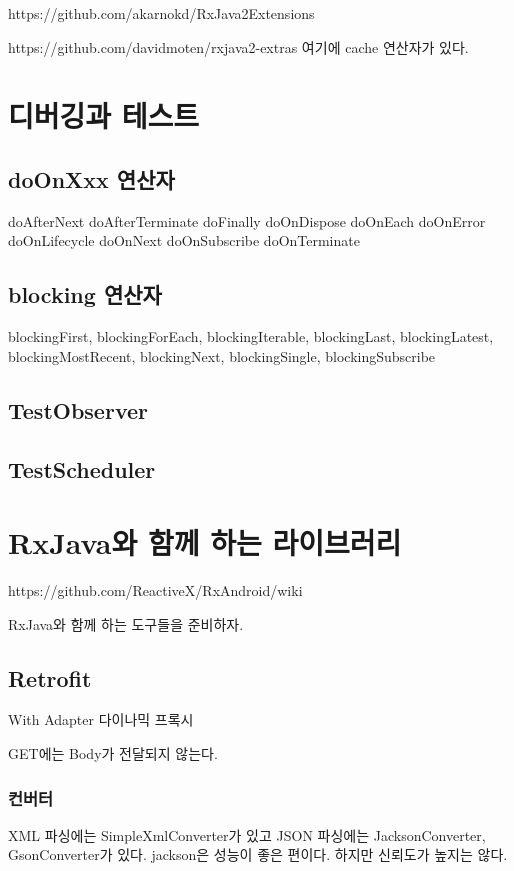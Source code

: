 \documentclass{book}
\begin{document}
{https://github.com/akarnokd/RxJava2Extensions

https://github.com/davidmoten/rxjava2-extras
여기에 cache 연산자가 있다.



\chapter{디버깅과 테스트}	
\section{doOnXxx 연산자}
doAfterNext
doAfterTerminate
doFinally
doOnDispose
doOnEach
doOnError
doOnLifecycle
doOnNext
doOnSubscribe
doOnTerminate

\section{blocking 연산자}
blockingFirst,
blockingForEach,
blockingIterable,
blockingLast,
blockingLatest,
blockingMostRecent,
blockingNext,
blockingSingle,
blockingSubscribe

\section{TestObserver}

\section{TestScheduler}

\chapter{RxJava와 함께 하는 라이브러리}
https://github.com/ReactiveX/RxAndroid/wiki

RxJava와 함께 하는 도구들을 준비하자. 


\section{Retrofit}
With Adapter
다이나믹 프록시

GET에는 Body가 전달되지 않는다. 

\subsection{컨버터}
XML 파싱에는 SimpleXmlConverter가 있고 JSON 파싱에는 JacksonConverter, GsonConverter가 있다.
jackson은 성능이 좋은 편이다. 하지만 신뢰도가 높지는 않다.

}
\end{document}
